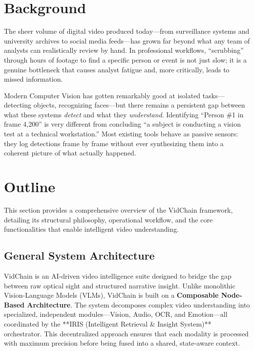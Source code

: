 \section{Background}
The sheer volume of digital video produced today—from surveillance systems and university archives to social media feeds—has grown far beyond what any team of analysts can realistically review by hand. In professional workflows, ``scrubbing'' through hours of footage to find a specific person or event is not just slow; it is a genuine bottleneck that causes analyst fatigue and, more critically, leads to missed information.

Modern Computer Vision has gotten remarkably good at isolated tasks—detecting objects, recognizing faces—but there remains a persistent gap between what these systems \textit{detect} and what they \textit{understand}. Identifying ``Person \#1 in frame 4,200'' is very different from concluding ``a subject is conducting a vision test at a technical workstation.'' Most existing tools behave as passive sensors: they log detections frame by frame without ever synthesizing them into a coherent picture of what actually happened.

\section{Outline}
This section provides a comprehensive overview of the VidChain framework, detailing its structural philosophy, operational workflow, and the core functionalities that enable intelligent video understanding.

\subsection{General System Architecture}
VidChain is an AI-driven video intelligence suite designed to bridge the gap between raw optical sight and structured narrative insight. Unlike monolithic Vision-Language Models (VLMs), VidChain is built on a \textbf{Composable Node-Based Architecture}. The system decomposes complex video understanding into specialized, independent modules—Vision, Audio, OCR, and Emotion—all coordinated by the **IRIS (Intelligent Retrieval \& Insight System)** orchestrator. This decentralized approach ensures that each modality is processed with maximum precision before being fused into a shared, state-aware context.

